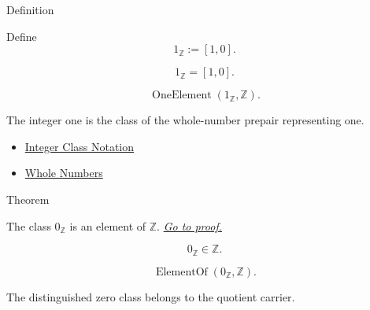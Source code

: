 \begin{definitionbox}{Definition}
\begin{definition}
\label{def:one-in-z}
Define
\[
1_{\mathbb{Z}}:=[1,0].
\]
\end{definition}
\end{definitionbox}

\begin{remark*}
\[
1_{\mathbb{Z}}=[1,0].
\]
\end{remark*}

\begin{remark*}
\[
\operatorname{OneElement}(1_{\mathbb{Z}},\mathbb{Z}).
\]
\end{remark*}

\begin{remark*}[Interpretation]
The integer one is the class of the whole-number prepair representing one.
\end{remark*}

\begin{dependencies}
\begin{itemize}
  \item \hyperref[def:integer-class-notation]{Integer Class Notation}
  \item \hyperref[def:whole-numbers]{Whole Numbers}
\end{itemize}
\end{dependencies}

\begin{theorembox}{Theorem}
\begin{theorem}
\label{thm:zero-is-an-integer}
The class $0_{\mathbb{Z}}$ is an element of $\mathbb{Z}$.
\hyperref[prf:zero-is-an-integer]{\textit{Go to proof.}}
\end{theorem}
\end{theorembox}

\begin{remark*}
\[
0_{\mathbb{Z}}\in\mathbb{Z}.
\]
\end{remark*}

\begin{remark*}
\[
\operatorname{ElementOf}(0_{\mathbb{Z}},\mathbb{Z}).
\]
\end{remark*}

\begin{remark*}[Interpretation]
The distinguished zero class belongs to the quotient carrier.
\end{remark*}

